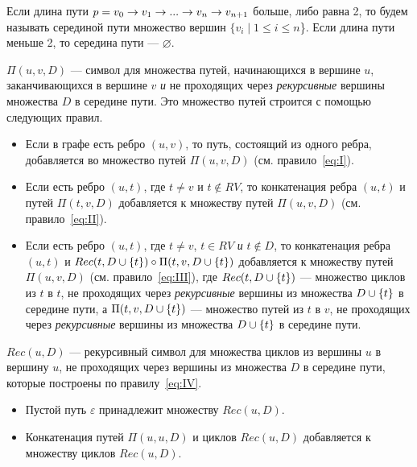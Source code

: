 \begin{defn}
Если длина пути $p = v_0 \rightarrow v_1 \rightarrow ... \rightarrow v_n \rightarrow v_{n+1}$ больше, либо равна 2, то будем называть серединой пути множество вершин 
$\{v_i \mid 1 \leq i \leq n$\}. Если длина пути меньше 2, то середина пути --- $\varnothing$.

\begin{defn}
$\Pi(u,v,D)$ --- символ для множества путей, начинающихся в вершине $u$, заканчивающихся в вершине $v$ \emph{и} не проходящих через \emph{рекурсивные}
вершины множества $D$ в середине пути. Это множество путей строится с помощью следующих правил.
\begin{itemize}
    \item Если в графе есть ребро $(u,v)$, то путь, состоящий из одного ребра, добавляется во множество путей $\Pi(u,v,D)$ (см. правило~\ref{eq:I}).
    \item Если есть ребро $(u,t)$, где $t \neq v$ и $t \notin RV$, то конкатенация ребра $(u,t)$ и путей $\Pi(t,v,D)$ добавляется к множеству путей $\Pi(u,v,D)$ (см. правило~\ref{eq:II}).
    \item Если есть ребро $(u,t)$, где $t \neq v$, $t \in RV$ \emph{и} $t \notin D$, то конкатенация ребра $(u,t)$ и $Rec(t,D \cup \{t\}) \circ \Pi(t,v,D \cup \{t\})$ добавляется к множеству путей $\Pi(u,v,D)$ (см. правило~\ref{eq:III}), где $Rec(t,D \cup \{t\})$ --- множество циклов из $t$ в $t$, не проходящих через
    \emph{рекурсивные} вершины из множества $D \cup \{t\}$ в середине пути, а $\Pi(t,v,D \cup \{t\})$ --- множество путей из $t$ в $v$, не проходящих через \emph{рекурсивные} вершины из множества $D \cup \{t\}$ в середине пути. 
\end{itemize}

$Rec(u,D)$ --- рекурсивный символ для множества циклов из вершины $u$ в вершину $u$, не проходящих через вершины из множества $D$ в середине пути, которые построены по правилу~\ref{eq:IV}.
\begin{itemize}
    \item Пустой путь $\varepsilon$ принадлежит множеству $Rec(u,D)$.
    \item Конкатенация путей $\Pi(u,u,D)$ и циклов $Rec(u,D)$ добавляется к множеству циклов $Rec(u,D)$. 
\end{itemize}


\end{defn}
\end{defn}
